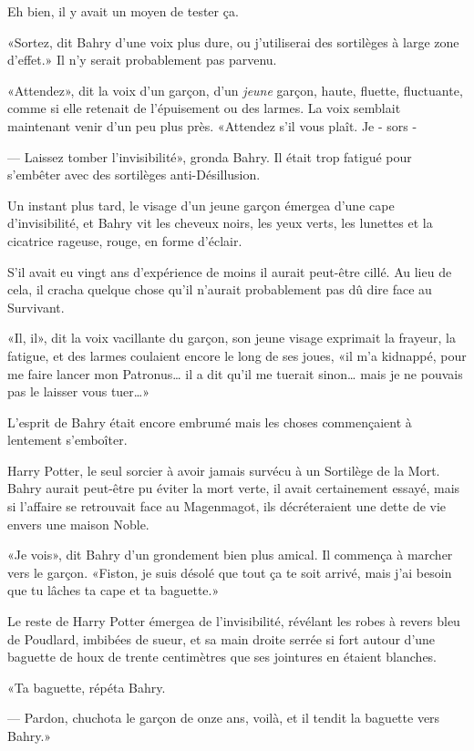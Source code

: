 Eh bien, il y avait un moyen de tester ça.

«Sortez, dit Bahry d'une voix plus dure, ou j'utiliserai des sortilèges à large zone d'effet.» Il n'y serait probablement pas parvenu.

«Attendez», dit la voix d'un garçon, d'un \emph{jeune} garçon, haute, fluette, fluctuante, comme si elle retenait de l'épuisement ou des larmes. La voix semblait maintenant venir d'un peu plus près. «Attendez s'il vous plaît. Je - sors -

--- Laissez tomber l'invisibilité», gronda Bahry. Il était trop fatigué pour s'embêter avec des sortilèges anti-Désillusion.

Un instant plus tard, le visage d'un jeune garçon émergea d'une cape d'invisibilité, et Bahry vit les cheveux noirs, les yeux verts, les lunettes et la cicatrice rageuse, rouge, en forme d'éclair.

S'il avait eu vingt ans d'expérience de moins il aurait peut-être cillé. Au lieu de cela, il cracha quelque chose qu'il n'aurait probablement pas dû dire face au Survivant.

«Il, il», dit la voix vacillante du garçon, son jeune visage exprimait la frayeur, la fatigue, et des larmes coulaient encore le long de ses joues, «il m'a kidnappé, pour me faire lancer mon Patronus… il a dit qu'il me tuerait sinon… mais je ne pouvais pas le laisser vous tuer…»

L'esprit de Bahry était encore embrumé mais les choses commençaient à lentement s'emboîter.

Harry Potter, le seul sorcier à avoir jamais survécu à un Sortilège de la Mort. Bahry aurait peut-être pu éviter la mort verte, il avait certainement essayé, mais si l'affaire se retrouvait face au Magenmagot, ils décréteraient une dette de vie envers une maison Noble.

«Je vois», dit Bahry d'un grondement bien plus amical. Il commença à marcher vers le garçon. «Fiston, je suis désolé que tout ça te soit arrivé, mais j'ai besoin que tu lâches ta cape et ta baguette.»

Le reste de Harry Potter émergea de l'invisibilité, révélant les robes à revers bleu de Poudlard, imbibées de sueur, et sa main droite serrée si fort autour d'une baguette de houx de trente centimètres que ses jointures en étaient blanches.

«Ta baguette, répéta Bahry.

--- Pardon, chuchota le garçon de onze ans, voilà, et il tendit la baguette vers Bahry.»

